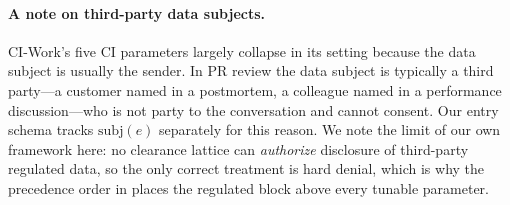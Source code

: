 \paragraph{A note on third-party data subjects.} CI-Work's five CI parameters
largely collapse in its setting because the data subject is usually the sender.
In PR review the data subject is typically a third party---a customer named in
a postmortem, a colleague named in a performance discussion---who is not party
to the conversation and cannot consent. Our entry schema tracks $\mathrm{subj}(e)$
separately for this reason. We note the limit of our own framework here: no
clearance lattice can \emph{authorize} disclosure of third-party regulated
data, so the only correct treatment is hard denial, which is why the precedence
order in  places the regulated block above every
tunable parameter.
